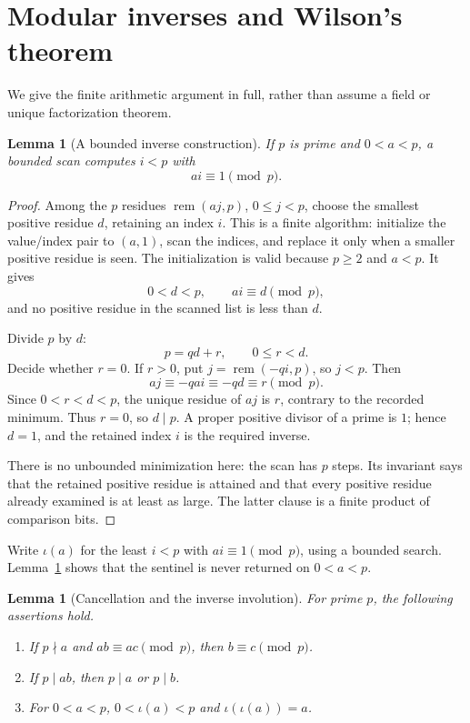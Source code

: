 \documentclass[11pt,letterpaper]{article}
\newtheorem{lemma}[theorem]{Lemma}
\theoremstyle{definition}
\theoremstyle{remark}
\newcommand{\remd}{\operatorname{rem}}
\begin{document}
\section{Modular inverses and Wilson's theorem}
\label{sec:wilson}

We give the finite arithmetic argument in full, rather than assume a
field or unique factorization theorem.

\begin{lemma}[A bounded inverse construction]
\label{lem:inverse}
If \(p\) is prime and \(0<a<p\), a bounded scan computes \(i<p\) with
\[
 ai\equiv1\pmod p.
\]
\end{lemma}

\begin{proof}
Among the \(p\) residues \(\remd(aj,p)\), \(0\le j<p\), choose the smallest
positive residue \(d\), retaining an index \(i\). This is a finite
algorithm: initialize the value/index pair to \((a,1)\), scan the indices,
and replace it only when a smaller positive residue is seen. The
initialization is valid because \(p\ge2\) and \(a<p\).
It gives
\[
 0<d<p,\qquad ai\equiv d\pmod p,
\]
and no positive residue in the scanned list is less than \(d\).

Divide \(p\) by \(d\):
\[
 p=qd+r,\qquad 0\le r<d.
\]
Decide whether \(r=0\). If \(r>0\), put \(j=\remd(-qi,p)\), so \(j<p\).
Then
\[
 aj\equiv-qai\equiv-qd\equiv r\pmod p.
\]
Since \(0<r<d<p\), the unique residue of \(aj\) is \(r\), contrary to
the recorded minimum. Thus \(r=0\), so \(d\mid p\). A proper positive
divisor of a prime is \(1\); hence \(d=1\), and the retained index \(i\)
is the required inverse.

There is no unbounded minimization here: the scan has \(p\) steps. Its
invariant says that the retained positive residue is attained and that
every positive residue already examined is at least as large. The latter
clause is a finite product of comparison bits.
\end{proof}

Write \(\iota(a)\) for the least \(i<p\) with \(ai\equiv1\pmod p\), using
a bounded search. Lemma~\ref{lem:inverse} shows that the sentinel is
never returned on \(0<a<p\).

\begin{lemma}[Cancellation and the inverse involution]
\label{lem:cancel}
For prime \(p\), the following assertions hold.
\begin{enumerate}
\item If \(p\nmid a\) and \(ab\equiv ac\pmod p\), then
      \(b\equiv c\pmod p\).
\item If \(p\mid ab\), then \(p\mid a\) or \(p\mid b\).
\item For \(0<a<p\), \(0<\iota(a)<p\) and \(\iota(\iota(a))=a\).
\end{enumerate}
\end{lemma}
\end{document}
